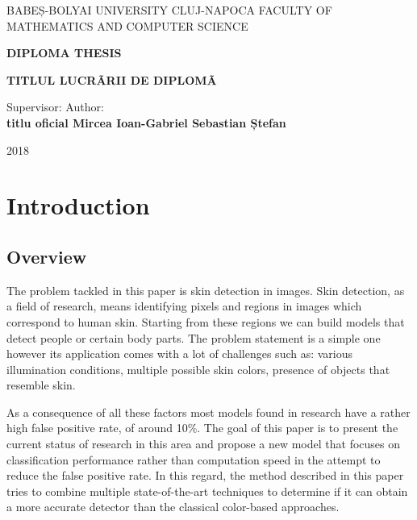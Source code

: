 \documentclass[12pt]{report}
\begin{document}
	\listoftodos
	
	\begin{titlepage}
		
		\begin{center}
			\Large{{BABEȘ-BOLYAI UNIVERSITY CLUJ-NAPOCA}}
			\newline
			\Large{{FACULTY OF MATHEMATICS AND COMPUTER SCIENCE}}
			
			\vspace{8cm}
			
			\textbf{DIPLOMA THESIS}
			
			\vspace{1cm}
			\Huge\textbf{{TITLUL LUCRÃRII DE DIPLOMÃ}}
			\fontsize{12}{14}
			
		\end{center}
		\vspace{6cm}
		
		\hspace*{0.8cm}Supervisor: \hfill  Author: \hspace*{0.8cm} \\    
		\textbf{titlu oficial Mircea Ioan-Gabriel \hfill  \textbf{Sebastian Ștefan}}
		
		\vspace{2cm}
		\begin{center}
			\Large{2018}
		\end{center}
	\end{titlepage}  
	
	\tableofcontents
	\listoffigures
	\listoftables
	\newpage
	
	\chapter{Introduction}
	
	\section{Overview}
	
	The problem tackled in this paper is skin detection in images. Skin detection, as a field of research,  means identifying pixels and regions in images which correspond to human skin. Starting from these regions we can build models that detect people or certain body parts. The problem statement is a simple one however its application comes with a lot of challenges such as: various illumination conditions, multiple possible skin colors, presence of objects that resemble skin.
	
	As a consequence of all these factors most models found in research have a rather high false positive rate, of around 10\%. The goal of this paper is to present the current status of research in this area and propose a new model that focuses on classification performance rather than computation speed in the attempt to reduce the false positive rate. In this regard, the method described in this paper tries to combine multiple state-of-the-art techniques to determine if it can obtain a more accurate detector than the classical color-based approaches.
	
\end{document}
